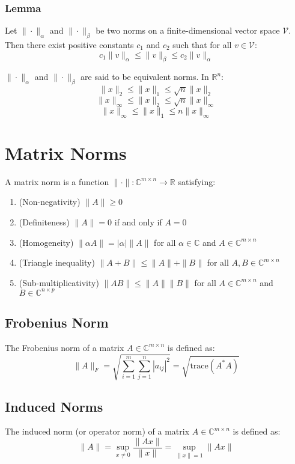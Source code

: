 \documentclass[11pt]{article}
\begin{document}
\subsubsection{Lemma}
Let $\|\cdot\|_\alpha$ and $\|\cdot\|_\beta$ be two norms on a finite-dimensional vector space $\mathcal{V}$. Then there exist positive constants $c_1$ and $c_2$ such that for all $v \in \mathcal{V}$:
\[c_1 \|v\|_\alpha \leq \|v\|_\beta \leq c_2 \|v\|_\alpha\]

$\|\cdot\|_\alpha$ and $\|\cdot\|_\beta$ are said to be equivalent norms. In $\mathbb{R}^n$:
\[\|x\|_2 \leq \|x\|_1 \leq \sqrt{n} \|x\|_2\]
\[\|x\|_\infty \leq \|x\|_2 \leq \sqrt{n} \|x\|_\infty\]
\[\|x\|_\infty \leq \|x\|_1 \leq n \|x\|_\infty\]

\section{Matrix Norms}
A matrix norm is a function $\|\cdot\| : \mathbb{C}^{m \times n} \to \mathbb{R}$ satisfying:
\begin{enumerate}
    \item (Non-negativity) $\|A\| \geq 0$
    \item (Definiteness) $\|A\| = 0$ if and only if $A = 0$
    \item (Homogeneity) $\|\alpha A\| = |\alpha| \|A\|$ for all $\alpha \in \mathbb{C}$ and $A \in \mathbb{C}^{m \times n}$ 
    \item (Triangle inequality) $\|A + B\| \leq \|A\| + \|B\|$ for all $A, B \in \mathbb{C}^{m \times n}$
    \item (Sub-multiplicativity) $\|AB\| \leq \|A\| \|B\|$ for all $A \in \mathbb{C}^{m \times n}$ and $B \in \mathbb{C}^{n \times p}$
\end{enumerate}

\subsection{Frobenius Norm}
The Frobenius norm of a matrix $A \in \mathbb{C}^{m \times n}$ is defined as:
\[\|A\|_F = \sqrt{\sum_{i=1}^{m} \sum_{j=1}^{n} |a_{ij}|^2} = \sqrt{\text{trace}(A^* A)}\]

\subsection{Induced Norms}
The induced norm (or operator norm) of a matrix $A \in \mathbb{C}^{m \times n}$ is defined as:
\[\|A\| = \sup_{x \neq 0} \frac{\|Ax\|}{\|x\|} = \sup_{\|x\| = 1} \|Ax\|\]  
\end{document}
